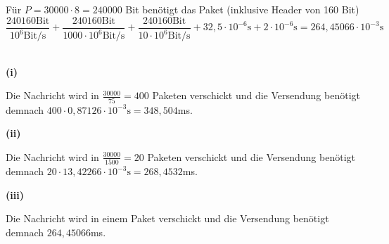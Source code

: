 \documentclass{../exercisesheet}
\begin{document}
\begin{exercise}{5}
\begin{subexercise}
\begin{adjustwidth}{2em}{0em}
Für $P=30000 \cdot 8=240000$ Bit benötigt das Paket (inklusive Header von 160 Bit)
\[
\frac{240160 \text{Bit}}{10^6 \text{Bit/s}} + \frac{240160 \text{Bit}}{1000 \cdot 10^6 \text{Bit/s}} + \frac{240160 \text{Bit}}{10 \cdot 10^6 \text{Bit/s}} + 32,5 \cdot 10^{-6}\text{s}
+ 2 \cdot 10^{-6}\text{s} = 264,45066 \cdot 10^{-3}\text{s}
\] \ \\
\end{adjustwidth}
\end{subexercise}
\begin{subexercise}
\textbf{(i)}
\begin{adjustwidth}{2em}{0em}\vspace{-\baselineskip}
Die Nachricht wird in $\frac{30000}{75}=400$ Paketen verschickt und die Versendung benötigt demnach $400 \cdot 0,87126 \cdot 10^{-3}\text{s}=348,504$ms.
\end{adjustwidth}
\textbf{(ii)}
\begin{adjustwidth}{2em}{0em}\vspace{-\baselineskip}
Die Nachricht wird in $\frac{30000}{1500}=20$ Paketen verschickt und die Versendung benötigt demnach $20 \cdot 13,42266 \cdot 10^{-3}\text{s}=268,4532$ms.
\end{adjustwidth}
\textbf{(iii)}
\begin{adjustwidth}{2em}{0em}\vspace{-\baselineskip}
Die Nachricht wird in einem Paket verschickt und die Versendung benötigt demnach $264,45066$ms.
\end{adjustwidth}
\end{subexercise}
\end{exercise}
\end{document}
